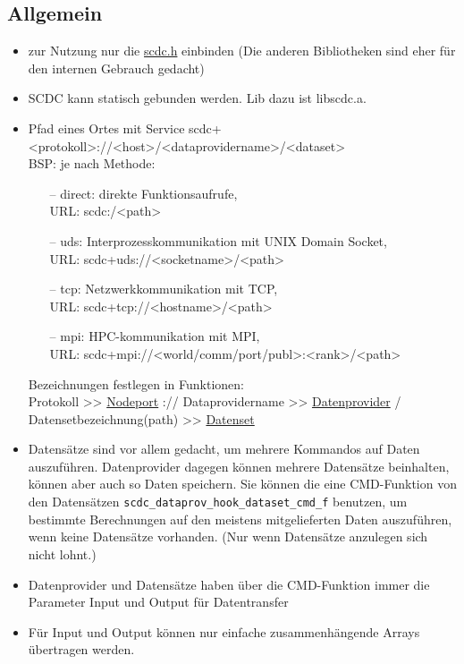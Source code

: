 \subsection{Allgemein}
\begin{itemize}
\item zur Nutzung nur die \hyperref[scdc.h]{scdc.h} einbinden (Die anderen Bibliotheken sind eher für den internen Gebrauch gedacht)
\item SCDC kann statisch gebunden werden. Lib dazu ist libscdc.a.
\item Pfad eines Ortes mit Service scdc+<protokoll>://<host>/<dataprovidername>/<dataset>\\
      BSP: je nach Methode:
      \begin{itemize}
      \item[--] {\color{darkgreen}direct:} direkte Funktionsaufrufe, \\
                URL: scdc:/<path>
      \item[--] {\color{darkgreen}uds:} Interprozesskommunikation mit UNIX Domain Socket, \\
                URL: scdc+uds://<socketname>/<path>
      \item[--] {\color{darkgreen}tcp:} Netzwerkkommunikation mit TCP, \\
                URL: scdc+tcp://<hostname>/<path>
      \item[--] {\color{darkgreen}mpi:} HPC-kommunikation mit MPI,\\
                URL: scdc+mpi://<world/comm/port/publ>:<rank>/<path>
      \end{itemize}
      Bezeichnungen festlegen in Funktionen:\\
      Protokoll >> \hyperref[scdc_nodeport_open]{Nodeport} :// Dataprovidername >> \hyperref[scdc_dataprov_open]{Datenprovider} / 
      Datensetbezeichnung(path) >> \hyperref[scdc_dataset_open]{Datenset}
\item Datensätze sind vor allem gedacht, um mehrere Kommandos auf Daten auszuführen. Datenprovider dagegen können mehrere Datensätze beinhalten, können aber auch so Daten speichern. Sie können die eine CMD-Funktion von den Datensätzen \texttt{scdc\_dataprov\_hook\_dataset\_cmd\_f} benutzen, um bestimmte Berechnungen auf den meistens mitgelieferten Daten auszuführen, wenn keine Datensätze vorhanden. (Nur wenn Datensätze anzulegen sich nicht lohnt.)
\item Datenprovider und Datensätze haben über die CMD-Funktion immer die Parameter Input und Output für Datentransfer
\item Für Input und Output können nur einfache zusammenhängende Arrays übertragen werden.
\end{itemize}

